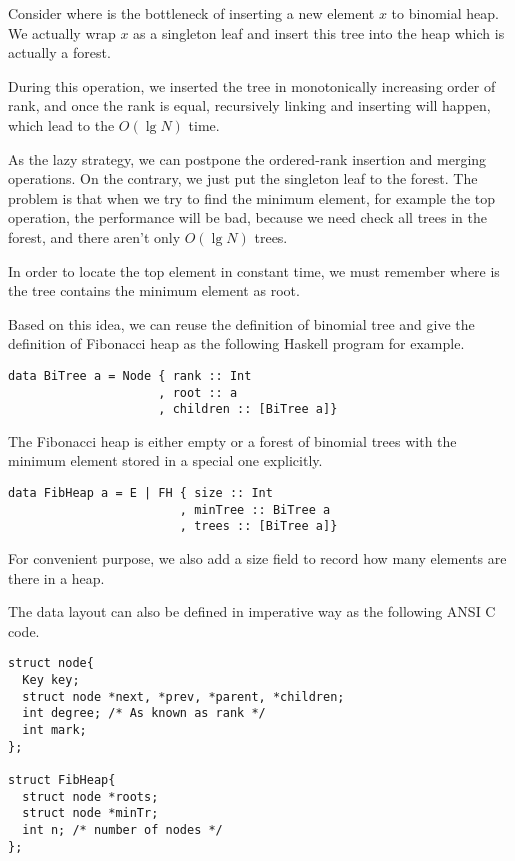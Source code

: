\documentclass{article}
\begin{document}
Consider where is the bottleneck of inserting a new element $x$ to 
binomial heap. We actually wrap $x$ as a singleton leaf and insert 
this tree into the heap which is actually a forest. 

During this operation, we inserted the tree in 
monotonically increasing order of rank, and once the rank is equal,
recursively linking and inserting will happen, which lead to the
$O(\lg N)$ time.

As the lazy strategy, we can postpone the ordered-rank insertion and
merging operations. On the contrary, we just put the singleton
leaf to the forest. The problem is that when we try to find the
minimum element, for example the top operation, the performance
will be bad, because we need check all trees in the forest, and 
there aren't only $O(\lg N)$ trees.

In order to locate the top element in constant time, we must remember
where is the tree contains the minimum element as root.

Based on this idea, we can reuse the definition of binomial tree
and give the definition of Fibonacci heap as the following Haskell
program for example.

\lstset{language=Haskell}
\begin{lstlisting}
data BiTree a = Node { rank :: Int
                     , root :: a
                     , children :: [BiTree a]}
\end{lstlisting}

The Fibonacci heap is either empty or a forest of binomial trees with
the minimum element stored in a special one explicitly.

\begin{lstlisting}
data FibHeap a = E | FH { size :: Int
                        , minTree :: BiTree a
                        , trees :: [BiTree a]}
\end{lstlisting}

For convenient purpose, we also add a size field to record how many
elements are there in a heap.

The data layout can also be defined in imperative way as the following
ANSI C code.

\lstset{language=C}
\begin{lstlisting}
struct node{
  Key key;
  struct node *next, *prev, *parent, *children;
  int degree; /* As known as rank */
  int mark;
};

struct FibHeap{
  struct node *roots;
  struct node *minTr; 
  int n; /* number of nodes */
};
\end{lstlisting}
\end{document}
